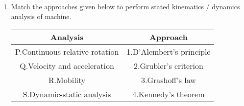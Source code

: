 \documentclass[journal]{IEEEtran}
\begin{document}
\begin{enumerate}[start=37]
\begin{figure}[H]
\label{fig:my_label}
\end{figure}
\begin{enumerate}
\end{enumerate}
\item Match the approaches given below to perform stated kinematics / dynamics analysis of machine.
	\begin{table}[h]
		\centering
	\begin{tabular}{|c|c|} 
		\hline \textbf{Analysis} & \textbf{Approach} \\ \hline P.Continuous relative rotation & 1.D'Alembert's principle \\ \hline Q.Velocity and acceleration & 2.Grubler's criterion \\ \hline R.Mobility & 3.Grashoff's law \\ \hline S.Dynamic-static analysis & 4.Kennedy's theorem \\ \hline 
	\end{tabular}
	\end{table}


\end{enumerate}
\end{document}
